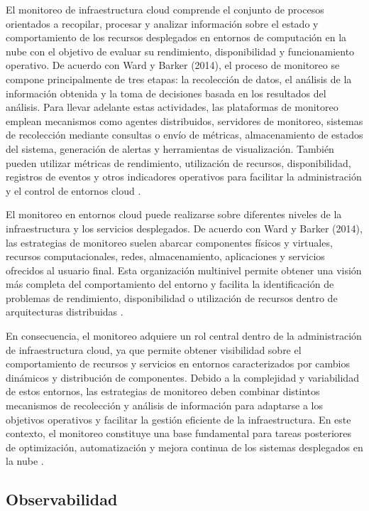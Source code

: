 El monitoreo de infraestructura cloud comprende el conjunto de procesos orientados a recopilar, procesar y analizar información sobre el estado y comportamiento de los recursos desplegados en entornos de computación en la nube con el objetivo de evaluar su rendimiento, disponibilidad y funcionamiento operativo. De acuerdo con Ward y Barker (2014), el proceso de monitoreo se compone principalmente de tres etapas: la recolección de datos, el análisis de la información obtenida y la toma de decisiones basada en los resultados del análisis. Para llevar adelante estas actividades, las plataformas de monitoreo emplean mecanismos como agentes distribuidos, servidores de monitoreo, sistemas de recolección mediante consultas o envío de métricas, almacenamiento de estados del sistema, generación de alertas y herramientas de visualización. También pueden utilizar métricas de rendimiento, utilización de recursos, disponibilidad, registros de eventos y otros indicadores operativos para facilitar la administración y el control de entornos cloud \parencite{Ward2014}.

El monitoreo en entornos cloud puede realizarse sobre diferentes niveles de la infraestructura y los servicios desplegados. De acuerdo con Ward y Barker (2014), las estrategias de monitoreo suelen abarcar componentes físicos y virtuales, recursos computacionales, redes, almacenamiento, aplicaciones y servicios ofrecidos al usuario final. Esta organización multinivel permite obtener una visión más completa del comportamiento del entorno y facilita la identificación de problemas de rendimiento, disponibilidad o utilización de recursos dentro de arquitecturas distribuidas \parencite{Ward2014}.

En consecuencia, el monitoreo adquiere un rol central dentro de la administración de infraestructura cloud, ya que permite obtener visibilidad sobre el comportamiento de recursos y servicios en entornos caracterizados por cambios dinámicos y distribución de componentes. Debido a la complejidad y variabilidad de estos entornos, las estrategias de monitoreo deben combinar distintos mecanismos de recolección y análisis de información para adaptarse a los objetivos operativos y facilitar la gestión eficiente de la infraestructura. En este contexto, el monitoreo constituye una base fundamental para tareas posteriores de optimización, automatización y mejora continua de los sistemas desplegados en la nube \parencite{Ward2014}.

\subsection{Observabilidad}

